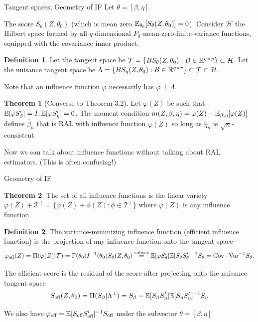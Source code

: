 \documentclass[10pt,aspectratio=169,handout]{beamer}
\theoremstyle{definition}
\newtheorem{thm}{Theorem}
\newtheorem{defn}{Definition}
\begin{document}
\begin{frame}{Tangent spaces, Geometry of IF}
\small
  Let $\theta = [\beta,\eta]$.

  The score $S_{\theta}(Z, \theta_0)$ (which is mean zero $\mathbb{E}_{\theta_0} 
  [S_\theta(Z,\theta_0)] = 0$). Consider $\mathcal H$ the \alert{Hilbert
  space}
  formed by all $q$-dimensional $P_0$-mean-zero-finite-variance functions,
  equipped
  with the covariance inner product.
  
  \begin{defn}
    Let the \alert{tangent space} be $\mathcal T = \{BS_\theta(Z, \theta_0) : B\in \mathbb{R}^
    {q\times p}\} \subset \mathcal H$. Let the \alert{nuisance tangent
    space} be $\Lambda = \{BS_\eta(Z, \theta_0) : B \in \mathbb{R}^{q\times r}\}
    \subset \mathcal T \subset \mathcal H$. 
  \end{defn}
  
  Note that an influence function $\varphi$ necessarily has \alert{$\varphi
  \perp
    \Lambda$}.
    
    \begin{thm}[Converse to Theorem 3.2]
      Let $\varphi(Z)$ be such that $\mathbb{E}[\varphi S_\beta'] = I, \mathbb{E}[\varphi
      S_\eta'] = 0$. The moment condition $m(Z,\beta,\eta) = \varphi(Z) -
      \mathbb{E}_{\beta,\eta}[\varphi(Z)]$ defines $\hat\beta_n$ that is RAL with
      influence function $\varphi(Z)$ so long as $\hat\eta_n$ is $
      \sqrt{n}$-consistent.
    \end{thm}
    Now we can talk about influence functions \alert{without} talking about
    RAL estimators. (This is often confusing!)
\end{frame}

\begin{frame}{Geometry of IF}
\small
  \begin{thm}
    The set of all influence functions is the \alert{linear variety} $
    \varphi(Z) + \mathcal T^\perp = \{\varphi(Z) + \phi(Z) : \phi \in
    \mathcal T^\perp\}
    $
    where $\varphi(Z)$ is \alert{any} influence function.
  \end{thm}
  
  \begin{defn}
    The variance-minimizing influence function (\alert{efficient
    influence function}) is the projection of any influence function onto
    the tangent space \[\varphi_{\text{eff}}(Z) = \Pi( \varphi(Z) |
    \mathcal
    T) = \Gamma(\theta_0) I^{-1}(\theta_0) S_\theta(Z,\theta_0) 
    \overset{\text{subvec}}{=} \mathbb{E}[\varphi S_\theta']\mathbb{E}[S_\theta
    S_\theta']^{-1} S_\theta = \mathrm{Cov} \cdot \mathrm{Var}^{-1}
    S_\theta.\]
    
    The \alert{efficient score} is the residual of the score after
    projecting onto the \alert{nuisance tangent space} \[
    S_{\text{eff}}(Z,\theta_0) = \Pi(S_\beta | \Lambda^{\perp}) = S_\beta -
    \mathbb{E}[S_\beta S_\eta'] \mathbb{E}[S_\eta S_\eta']^{-1} S_\eta
    \]
    
    We also have $\varphi_{\text{eff}} = \mathbb{E}[S_{\text{eff}}S_{\text{eff}}']^
    {-1}S_{\text{eff}}$ under the subvector $\theta = [\beta, \eta]$
  \end{defn}
\end{frame}
\end{document}
